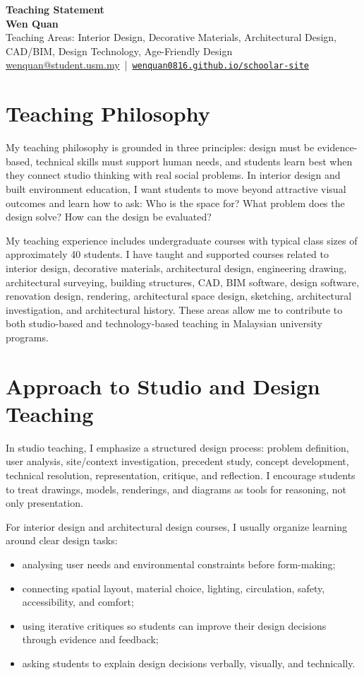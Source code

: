\documentclass[11pt,a4paper]{article}
\begin{document}
{\LARGE \textbf{Teaching Statement}}\\[-1pt]
\textbf{Wen Quan}\\
\textcolor{subtle}{Teaching Areas: Interior Design, Decorative Materials, Architectural Design, CAD/BIM, Design Technology, Age-Friendly Design}\\
\href{mailto:wenquan@student.usm.my}{wenquan@student.usm.my} \,|\, 
\href{https://wenquan0816.github.io/schoolar-site/}{\nolinkurl{wenquan0816.github.io/schoolar-site}}

\section*{Teaching Philosophy}
My teaching philosophy is grounded in three principles: design must be evidence-based, technical skills must support human needs, and students learn best when they connect studio thinking with real social problems. In interior design and built environment education, I want students to move beyond attractive visual outcomes and learn how to ask: Who is the space for? What problem does the design solve? How can the design be evaluated?

My teaching experience includes undergraduate courses with typical class sizes of approximately 40 students. I have taught and supported courses related to interior design, decorative materials, architectural design, engineering drawing, architectural surveying, building structures, CAD, BIM software, design software, renovation design, rendering, architectural space design, sketching, architectural investigation, and architectural history. These areas allow me to contribute to both studio-based and technology-based teaching in Malaysian university programs.

\section*{Approach to Studio and Design Teaching}
In studio teaching, I emphasize a structured design process: problem definition, user analysis, site/context investigation, precedent study, concept development, technical resolution, representation, critique, and reflection. I encourage students to treat drawings, models, renderings, and diagrams as tools for reasoning, not only presentation.

For interior design and architectural design courses, I usually organize learning around clear design tasks:
\begin{itemize}
  \item analysing user needs and environmental constraints before form-making;
  \item connecting spatial layout, material choice, lighting, circulation, safety, accessibility, and comfort;
  \item using iterative critiques so students can improve their design decisions through evidence and feedback;
  \item asking students to explain design decisions verbally, visually, and technically.
\end{itemize}
\end{document}
